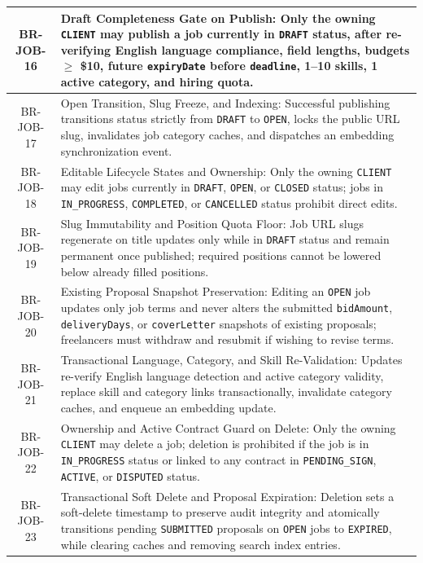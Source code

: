 \begin{longtable}{|c|p{12cm}|}
    BR-JOB-16 & Draft Completeness Gate on Publish: Only the owning \texttt{CLIENT} may publish a job currently in \texttt{DRAFT} status, after re-verifying English language compliance, field lengths, budgets $\ge$ \$10, future \texttt{expiryDate} before \texttt{deadline}, 1--10 skills, 1 active category, and hiring quota. \\ \hline
    BR-JOB-17 & Open Transition, Slug Freeze, and Indexing: Successful publishing transitions status strictly from \texttt{DRAFT} to \texttt{OPEN}, locks the public URL slug, invalidates job category caches, and dispatches an embedding synchronization event. \\ \hline
    BR-JOB-18 & Editable Lifecycle States and Ownership: Only the owning \texttt{CLIENT} may edit jobs currently in \texttt{DRAFT}, \texttt{OPEN}, or \texttt{CLOSED} status; jobs in \texttt{IN\_PROGRESS}, \texttt{COMPLETED}, or \texttt{CANCELLED} status prohibit direct edits. \\ \hline
    BR-JOB-19 & Slug Immutability and Position Quota Floor: Job URL slugs regenerate on title updates only while in \texttt{DRAFT} status and remain permanent once published; required positions cannot be lowered below already filled positions. \\ \hline
    BR-JOB-20 & Existing Proposal Snapshot Preservation: Editing an \texttt{OPEN} job updates only job terms and never alters the submitted \texttt{bidAmount}, \texttt{deliveryDays}, or \texttt{coverLetter} snapshots of existing proposals; freelancers must withdraw and resubmit if wishing to revise terms. \\ \hline
    BR-JOB-21 & Transactional Language, Category, and Skill Re-Validation: Updates re-verify English language detection and active category validity, replace skill and category links transactionally, invalidate category caches, and enqueue an embedding update. \\ \hline
    BR-JOB-22 & Ownership and Active Contract Guard on Delete: Only the owning \texttt{CLIENT} may delete a job; deletion is prohibited if the job is in \texttt{IN\_PROGRESS} status or linked to any contract in \texttt{PENDING\_SIGN}, \texttt{ACTIVE}, or \texttt{DISPUTED} status. \\ \hline
    BR-JOB-23 & Transactional Soft Delete and Proposal Expiration: Deletion sets a soft-delete timestamp to preserve audit integrity and atomically transitions pending \texttt{SUBMITTED} proposals on \texttt{OPEN} jobs to \texttt{EXPIRED}, while clearing caches and removing search index entries. \\ \hline

\end{longtable}

